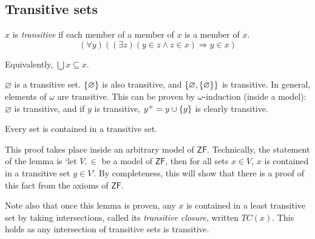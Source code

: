 \subsection{Transitive sets}
\begin{definition}
    \( x \) is \emph{transitive} if each member of a member of \( x \) is a member of \( x \).
    \[ (\forall y)((\exists z)(y \in z \wedge z \in x) \Rightarrow y \in x) \]
\end{definition}
Equivalently, \( \bigcup x \subseteq x \).
\begin{example}
    \( \varnothing \) is a transitive set.
    \( \qty{\varnothing} \) is also transitive, and \( \qty{\varnothing, \qty{\varnothing}} \) is transitive.
    In general, elements of \( \omega \) are transitive.
    This can be proven by \( \omega \)-induction (inside a model): \( \varnothing \) is transitive, and if \( y \) is transitive, \( y^+ = y \cup \qty{y} \) is clearly transitive.
\end{example}
\begin{lemma}
    Every set is contained in a transitive set.
\end{lemma}
\begin{remark}
    This proof takes place inside an arbitrary model of \( \mathsf{ZF} \).
    Technically, the statement of the lemma is `let \( V, \in \) be a model of \( \mathsf{ZF} \), then for all sets \( x \in V \), \( x \) is contained in a transitive set \( y \in V \)'.
    By completeness, this will show that there is a proof of this fact from the axioms of \( \mathsf{ZF} \).

    Note also that once this lemma is proven, any \( x \) is contained in a least transitive set by taking intersections, called its \emph{transitive closure}, written \( TC(x) \).
    This holds as any intersection of transitive sets is transitive.
\end{remark}
